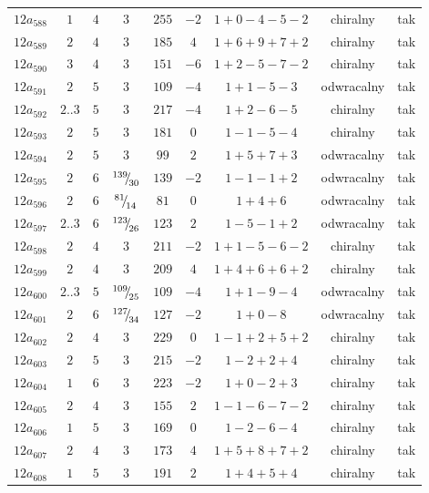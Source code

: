 \begin{longtable}{ccccccccc}
$12a_{588}$ & $1$ & $4$ & $3$ & $255$ & $-2$ & $1+0-4-5-2$ & chiralny & tak \\
$12a_{589}$ & $2$ & $4$ & $3$ & $185$ & $4$ & $1+6+9+7+2$ & chiralny & tak \\
$12a_{590}$ & $3$ & $4$ & $3$ & $151$ & $-6$ & $1+2-5-7-2$ & chiralny & tak \\
$12a_{591}$ & $2$ & $5$ & $3$ & $109$ & $-4$ & $1+1-5-3$ & odwracalny & tak \\
$12a_{592}$ & $2..3$ & $5$ & $3$ & $217$ & $-4$ & $1+2-6-5$ & chiralny & tak \\
$12a_{593}$ & $2$ & $5$ & $3$ & $181$ & $0$ & $1-1-5-4$ & chiralny & tak \\
$12a_{594}$ & $2$ & $5$ & $3$ & $99$ & $2$ & $1+5+7+3$ & odwracalny & tak \\
$12a_{595}$ & $2$ & $6$ & ${}^{139}{\mskip -5mu/\mskip -3mu}_{30}$ & $139$ & $-2$ & $1-1-1+2$ & odwracalny & tak \\
$12a_{596}$ & $2$ & $6$ & ${}^{81}{\mskip -5mu/\mskip -3mu}_{14}$ & $81$ & $0$ & $1+4+6$ & odwracalny & tak \\
$12a_{597}$ & $2..3$ & $6$ & ${}^{123}{\mskip -5mu/\mskip -3mu}_{26}$ & $123$ & $2$ & $1-5-1+2$ & odwracalny & tak \\
$12a_{598}$ & $2$ & $4$ & $3$ & $211$ & $-2$ & $1+1-5-6-2$ & chiralny & tak \\
$12a_{599}$ & $2$ & $4$ & $3$ & $209$ & $4$ & $1+4+6+6+2$ & chiralny & tak \\
$12a_{600}$ & $2..3$ & $5$ & ${}^{109}{\mskip -5mu/\mskip -3mu}_{25}$ & $109$ & $-4$ & $1+1-9-4$ & odwracalny & tak \\
$12a_{601}$ & $2$ & $6$ & ${}^{127}{\mskip -5mu/\mskip -3mu}_{34}$ & $127$ & $-2$ & $1+0-8$ & odwracalny & tak \\
$12a_{602}$ & $2$ & $4$ & $3$ & $229$ & $0$ & $1-1+2+5+2$ & chiralny & tak \\
$12a_{603}$ & $2$ & $5$ & $3$ & $215$ & $-2$ & $1-2+2+4$ & chiralny & tak \\
$12a_{604}$ & $1$ & $6$ & $3$ & $223$ & $-2$ & $1+0-2+3$ & chiralny & tak \\
$12a_{605}$ & $2$ & $4$ & $3$ & $155$ & $2$ & $1-1-6-7-2$ & chiralny & tak \\
$12a_{606}$ & $1$ & $5$ & $3$ & $169$ & $0$ & $1-2-6-4$ & chiralny & tak \\
$12a_{607}$ & $2$ & $4$ & $3$ & $173$ & $4$ & $1+5+8+7+2$ & chiralny & tak \\
$12a_{608}$ & $1$ & $5$ & $3$ & $191$ & $2$ & $1+4+5+4$ & chiralny & tak \\

\end{longtable}

